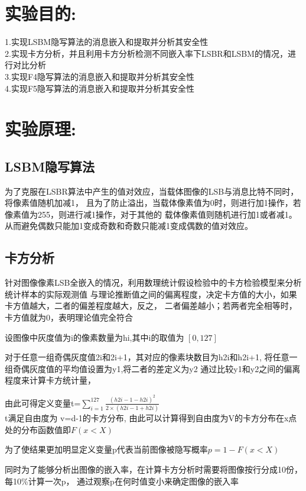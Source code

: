 \documentclass[a4paper,11pt,UTF8]{ctexart}
\begin{document}
\section{实验目的:}

  1.实现LSBM隐写算法的消息嵌入和提取并分析其安全性\\
  \hspace*{22pt}2.实现卡方分析，并且利用卡方分析检测不同嵌入率下LSBR和LSBM的情况，进行对比分析\\
  \hspace*{22pt}3.实现F4隐写算法的消息嵌入和提取并分析其安全性\\
  \hspace*{22pt}4.实现F5隐写算法的消息嵌入和提取并分析其安全性

\section{实验原理:}

  \subsection{LSBM隐写算法}
    为了克服在LSBR算法中产生的值对效应，当载体图像的LSB与消息比特不同时，将像素值随机加减1，
    且为了防止溢出，当载体像素值为0时，则进行加1操作，若像素值为255，则进行减1操作，对于其他的
    载体像素值则随机进行加1或者减1。从而避免偶数只能加1变成奇数和奇数只能减1变成偶数的值对效应。

  \subsection{卡方分析}
    针对图像像素LSB全嵌入的情况，利用数理统计假设检验中的卡方检验模型来分析统计样本的实际观测值
    与理论推断值之间的偏离程度，决定卡方值的大小，如果卡方值越大，二者的偏差程度越大，反之，
    二者偏差越小；若两者完全相等时，卡方值就为0，表明理论值完全符合\par
    设图像中灰度值为i的像素数量为h{\scriptsize i},其中i的取值为 $[0,127]$\par
    对于任意一组奇偶灰度值2i和2i+1，其对应的像素块数目为h{\scriptsize 2i}和h{\scriptsize 2i+1},
    将任意一组奇偶灰度值的平均值设置为y{\scriptsize 1},将二者的差定义为y{\scriptsize 2}
    通过比较y{\scriptsize 1}和y{\scriptsize 2}之间的偏离程度来计算卡方统计量，\par
    由此可得定义变量t=$\sum_{i=1}^{127} \frac{\left ( h{2i-1} -h{2i} \right )^{2} }{2\times \left (h{2i-1}+h{2i}\right ) }$\\
    t满足自由度为 v=d-1的卡方分布,
    由此可以计算得到自由度为V的卡方分布在x点处的分布函数值即$F\left ( x<X \right ) $\par
    为了使结果更加明显定义变量p代表当前图像被隐写概率$p=1-F\left ( x<X \right ) $\par
    同时为了能够分析出图像的嵌入率，在计算卡方分析时需要将图像按行分成10份，每10\%计算一次p，
    通过观察p在何时值变小来确定图像的嵌入率
\end{document}
